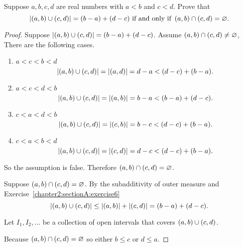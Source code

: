 \begin{exercise}\label{chapter2:sectionA:exercise7}
    Suppose $a, b, c, d$ are real numbers with $a < b$ and $c < d$. Prove that
    \[
        \left\vert{\left({a, b}\right)\cup \left({c, d}\right)}\right\vert = (b - a) + (d - c) \text{ if and only if }\left({a, b}\right)\cap\left({c, d}\right) = \varnothing.
    \]
\end{exercise}

\begin{proof}
    Suppose $\left\vert{\left({a, b}\right)\cup\left({c, d}\right)}\right\vert = (b - a) + (d - c)$. Assume $\left({a, b}\right) \cap\left({c, d}\right) \ne \varnothing$, There are the following cases.
    \begin{enumerate}[label={(\roman*)}]
        \item $a < c < b < d$
              \[
                  \left\vert{\left({a, b}\right)\cup\left({c, d}\right)}\right\vert = \left\vert{\left({a, d}\right)}\right\vert = d - a < (d - c) + (b - a).
              \]
        \item $a < c < d < b$
              \[
                  \left\vert{\left({a, b}\right)\cup\left({c, d}\right)}\right\vert = \left\vert{\left({a, b}\right)}\right\vert = b - a < (b - a) + (d - c).
              \]
        \item $c < a < d < b$
              \[
                  \left\vert{\left({a, b}\right)\cup\left({c, d}\right)}\right\vert = \left\vert{\left({c, b}\right)}\right\vert = b - c < (d - c) + (b - a).
              \]
        \item $c < a < b < d$
              \[
                  \left\vert{\left({a, b}\right)\cup\left({c, d}\right)}\right\vert = \left\vert{\left({c, d}\right)}\right\vert = d - c < (d - c) + (b - a).
              \]
    \end{enumerate}

    So the assumption is false. Therefore $\left({a, b}\right)\cap\left({c, d}\right) = \varnothing$.

    \bigskip

    Suppose $\left({a, b}\right)\cap\left({c, d}\right) = \varnothing$. By the subadditivity of outer measure and Exercise~\ref{chapter2:sectionA:exercise6}
    \[
        \left\vert{\left({a, b}\right)\cup\left({c, d}\right)}\right\vert \leq \left\vert{\left({a, b}\right)}\right\vert + \left\vert{\left({c, d}\right)}\right\vert = (b - a) + (d - c).
    \]

    Let $I_{1}, I_{2}, \ldots$ be a collection of open intervals that covers $\left({a, b}\right)\cup\left({c, d}\right)$.

    Because $\left({a, b}\right)\cap\left({c, d}\right) = \varnothing$ so either $b\leq c$ or $d\leq a$.


\end{proof}
